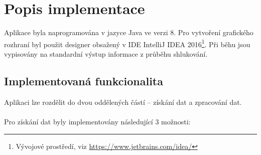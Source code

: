 \documentclass[pdftex,a4paper]{article}
\begin{document}
\newpage

\section{Popis implementace}
Aplikace byla naprogramována v jazyce Java ve verzi 8. Pro vytvoření grafického rozhraní byl použit designer obsažený v IDE IntelliJ IDEA 2016\footnote{Vývojové prostředí, viz \url{https://www.jetbrains.com/idea/}}. Při běhu jsou vypisovány na standardní výstup informace z průběhu shlukování.



\subsection{Implementovaná funkcionalita}
\noindent
Aplikaci lze rozdělit do dvou oddělených částí -- získání dat a zpracování dat.\\\\
\noindent
Pro získání dat byly implementovány následující 3 možnosti:
\end{document}
